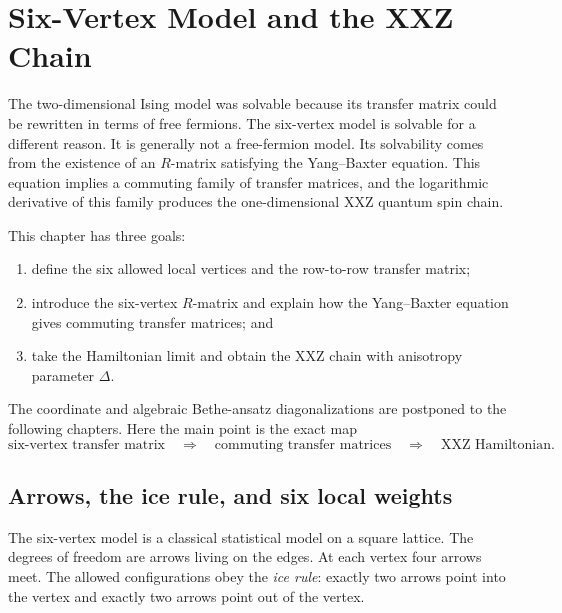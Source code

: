 \chapter{Six-Vertex Model and the XXZ Chain}
\label{chap:six-vertex-xxz}

The two-dimensional Ising model was solvable because its transfer matrix could be
rewritten in terms of free fermions.  The six-vertex model is solvable for a
different reason.  It is generally not a free-fermion model.  Its solvability
comes from the existence of an $R$-matrix satisfying the Yang--Baxter equation.
This equation implies a commuting family of transfer matrices, and the
logarithmic derivative of this family produces the one-dimensional XXZ quantum
spin chain.

This chapter has three goals:
\begin{enumerate}[label=(\roman*)]
    \item define the six allowed local vertices and the row-to-row transfer
    matrix;
    \item introduce the six-vertex $R$-matrix and explain how the Yang--Baxter
    equation gives commuting transfer matrices; and
    \item take the Hamiltonian limit and obtain the XXZ chain with anisotropy
    parameter $\Delta$.
\end{enumerate}
The coordinate and algebraic Bethe-ansatz diagonalizations are postponed to the
following chapters.  Here the main point is the exact map
\[
    \text{six-vertex transfer matrix}
    \quad\Longrightarrow\quad
    \text{commuting transfer matrices}
    \quad\Longrightarrow\quad
    \text{XXZ Hamiltonian}.
\]

\section{Arrows, the ice rule, and six local weights}
\label{sec:six-vertex-weights-ice-rule}

The six-vertex model is a classical statistical model on a square lattice.  The
degrees of freedom are arrows living on the edges.  At each vertex four arrows
meet.  The allowed configurations obey the \emph{ice rule}: exactly two arrows
point into the vertex and exactly two arrows point out of the vertex.

